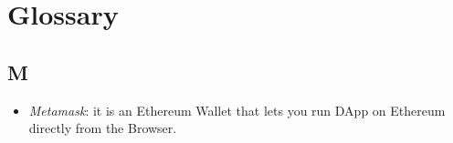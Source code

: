 \section*{Glossary}

\subsection*{M}
\begin{itemize}
\item \emph{Metamask}: it is an Ethereum Wallet that lets you run DApp on Ethereum directly from the Browser.
\end{itemize}